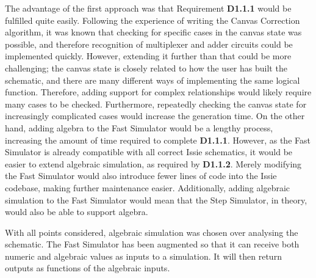 The advantage of the first approach was that Requirement \textbf{D1.1.1} would be fulfilled quite easily. Following the experience of writing the Canvas Correction algorithm, it was known that checking for specific cases in the canvas state was possible, and therefore recognition of multiplexer and adder circuits could be implemented quickly. However, extending it further than that could be more challenging; the canvas state is closely related to how the user has built the schematic, and there are many different ways of implementing the same logical function. Therefore, adding support for complex relationships would likely require many cases to be checked. Furthermore, repeatedly checking the canvas state for increasingly complicated cases would increase the generation time. On the other hand, adding algebra to the Fast Simulator would be a lengthy process, increasing the amount of time required to complete \textbf{D1.1.1}. However, as the Fast Simulator is already compatible with all correct Issie schematics, it would be easier to extend algebraic simulation, as required by \textbf{D1.1.2}. Merely modifying the Fast Simulator would also introduce fewer lines of code into the Issie codebase, making further maintenance easier. Additionally, adding algebraic simulation to the Fast Simulator would mean that the Step Simulator, in theory, would also be able to support algebra. 

With all points considered, algebraic simulation was chosen over analysing the schematic. The Fast Simulator has been augmented so that it can receive both numeric and algebraic values as inputs to a simulation. It will then return outputs as functions of the algebraic inputs.

